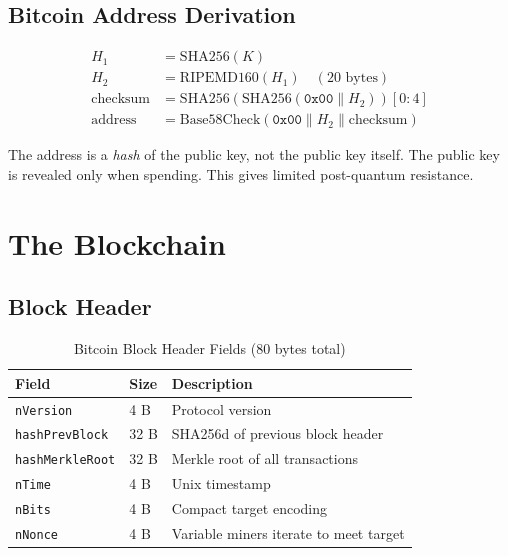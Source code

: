 \documentclass[12pt,a4paper,openany]{book}
\theoremstyle{definition}
\theoremstyle{plain}
\theoremstyle{remark}
\begin{document}
\subsection{Bitcoin Address Derivation}

\begin{align}
  H_1 &= \mathrm{SHA256}(K) \\
  H_2 &= \mathrm{RIPEMD160}(H_1) \quad (\text{20 bytes}) \\
  \text{checksum} &= \mathrm{SHA256}(\mathrm{SHA256}(\texttt{0x00}\|H_2))[0:4] \\
  \text{address} &= \mathrm{Base58Check}(\texttt{0x00}\|H_2\|\text{checksum})
\end{align}

\begin{exambox}
  The address is a \emph{hash} of the public key, not the public key
  itself.  The public key is revealed only when spending.  This gives
  limited post-quantum resistance.
\end{exambox}

\section{The Blockchain}

\subsection{Block Header}

\begin{table}[h]
\centering
\caption{Bitcoin Block Header Fields (80 bytes total)}
\begin{tabular}{llp{7cm}}
\toprule
\textbf{Field} & \textbf{Size} & \textbf{Description} \\
\midrule
\texttt{nVersion}      & 4 B  & Protocol version \\
\texttt{hashPrevBlock} & 32 B & SHA256d of previous block header \\
\texttt{hashMerkleRoot}& 32 B & Merkle root of all transactions \\
\texttt{nTime}         & 4 B  & Unix timestamp \\
\texttt{nBits}         & 4 B  & Compact target encoding \\
\texttt{nNonce}        & 4 B  & Variable miners iterate to meet target \\
\bottomrule
\end{tabular}
\end{table}
\end{document}
